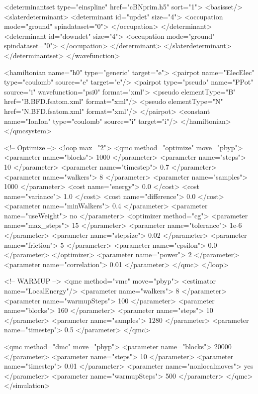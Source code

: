 \begin{lstcpp}
      <determinantset type="einspline" href="cBNprim.h5" sort="1">
        <basisset/>
        <slaterdeterminant>
          <determinant id="updet" size="4">    
            <occupation mode="ground" spindataset="0">
            </occupation>  
          </determinant>
          <determinant id="downdet" size="4">
            <occupation mode="ground" spindataset="0">
            </occupation>
          </determinant>
        </slaterdeterminant>
      </determinantset>
    </wavefunction>
   
   
    <hamiltonian name="h0" type="generic" target="e">
      <pairpot name="ElecElec" type="coulomb" source="e" target="e"/>
      <pairpot type="pseudo" name="PPot" source="i" wavefunction="psi0"
               format="xml">
        <pseudo elementType="B" href="B.BFD.fsatom.xml" format="xml"/>
        <pseudo elementType="N" href="N.BFD.fsatom.xml" format="xml"/>
      </pairpot>
      <constant name="IonIon" type="coulomb" source="i" target="i"/>
    </hamiltonian>
  </qmcsystem>
 
  <!-- Optimize -->
  <loop max="2">
    <qmc method="optimize" move="pbyp">
      <parameter name="blocks">  1000 </parameter>
      <parameter name="steps">     10 </parameter>
      <parameter name="timestep"> 0.7 </parameter>
      <parameter name="walkers">    8 </parameter>
      <parameter name="samples"> 1000 </parameter>
      <cost name="energy"> 0.0 </cost>
      <cost name="variance"> 1.0 </cost>
      <cost name="difference"> 0.0 </cost>
      <parameter name="minWalkers"> 0.4 </parameter>
      <parameter name="useWeight"> no </parameter>
      <optimizer method="cg">
        <parameter name="max_steps">   15 </parameter>
        <parameter name="tolerance"> 1e-6 </parameter>
        <parameter name="stepsize">  0.02 </parameter>
        <parameter name="friction">     5 </parameter>
        <parameter name="epsilon">    0.0 </parameter>
      </optimizer>
      <parameter name="power"> 2 </parameter>
      <parameter name="correlation"> 0.01 </parameter>
    </qmc>
  </loop>
 
  <!-- WARMUP -->
  <qmc method="vmc" move="pbyp">
    <estimator name="LocalEnergy"/>
    <parameter name="walkers">       8 </parameter>
    <parameter name="warmupSteps"> 100 </parameter>
    <parameter name="blocks">      160 </parameter>
    <parameter name="steps">        10 </parameter>
    <parameter name="samples">    1280 </parameter>
    <parameter name="timestep">    0.5 </parameter>
  </qmc>

  <qmc method="dmc" move="pbyp">
    <parameter name="blocks">       20000 </parameter>
    <parameter name="steps">           10 </parameter>
    <parameter name="timestep">      0.01 </parameter>
    <parameter name="nonlocalmoves">  yes </parameter>
    <parameter name="warmupSteps">    500 </parameter>
  </qmc>
</simulation>
\end{lstcpp}

